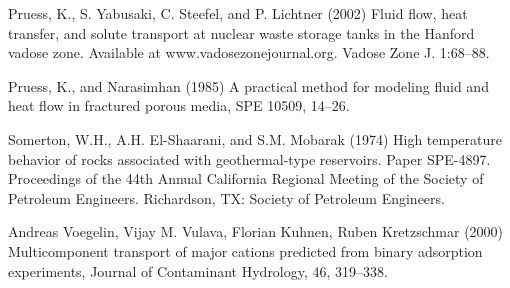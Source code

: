 \documentclass[12pt]{article}
\begin{document}
\begin{description}
\item Pruess, K., S. Yabusaki, C. Steefel, and P. Lichtner (2002) Fluid flow,
heat transfer, and solute transport at nuclear waste storage tanks in the Hanford vadose zone. Available at www.vadosezonejournal.org. Vadose Zone J. 1:68--88.

\item Pruess, K., and Narasimhan (1985) A practical method for modeling fluid and heat flow in fractured porous media, SPE 10509, 14--26.

\item Somerton, W.H., A.H. El-Shaarani, and S.M. Mobarak (1974) 
High temperature behavior of rocks associated with geothermal-type reservoirs. Paper SPE-4897. Proceedings of the 44th Annual 
California Regional Meeting of the Society of Petroleum Engineers. Richardson, TX: Society of Petroleum Engineers. 

\item Andreas Voegelin, Vijay M. Vulava, Florian Kuhnen, Ruben Kretzschmar (2000) Multicomponent transport of major cations predicted from binary adsorption experiments, Journal of Contaminant Hydrology, 46, 319--338.
\end{description}
\end{document}
